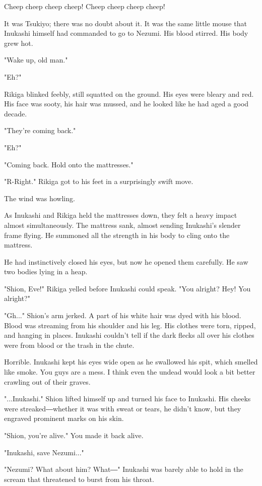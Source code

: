 Cheep cheep cheep cheep! Cheep cheep cheep cheep!

It was Tsukiyo; there was no doubt about it. It was the same little
mouse that Inukashi himself had commanded to go to Nezumi. His blood
stirred. His body grew hot.

"Wake up, old man."

"Eh?"

Rikiga blinked feebly, still squatted on the ground. His eyes were
bleary and red. His face was sooty, his hair was mussed, and he looked
like he had aged a good decade.

"They're coming back."

"Eh?"

"Coming back. Hold onto the mattresses."

"R-Right." Rikiga got to his feet in a surprisingly swift move.

The wind was howling.

As Inukashi and Rikiga held the mattresses down, they felt a heavy
impact almost simultaneously. The mattress sank, almost sending
Inukashi's slender frame flying. He summoned all the strength in his
body to cling onto the mattress.

He had instinctively closed his eyes, but now he opened them carefully.
He saw two bodies lying in a heap.

"Shion, Eve!" Rikiga yelled before Inukashi could speak. "You alright?
Hey! You alright?"

"Gh..." Shion's arm jerked. A part of his white hair was dyed with his
blood. Blood was streaming from his shoulder and his leg. His clothes
were torn, ripped, and hanging in places. Inukashi couldn't tell if the
dark flecks all over his clothes were from blood or the trash in the
chute.

Horrible. Inukashi kept his eyes wide open as he swallowed his spit,
which smelled like smoke. You guys are a mess. I think even the undead
would look a bit better crawling out of their graves.

"...Inukashi." Shion lifted himself up and turned his face to Inukashi.
His cheeks were streaked―whether it was with sweat or tears, he didn't
know, but they engraved prominent marks on his skin.

"Shion, you're alive." You made it back alive.

"Inukashi, save Nezumi..."

"Nezumi? What about him? What―" Inukashi was barely able to hold in the
scream that threatened to burst from his throat.

